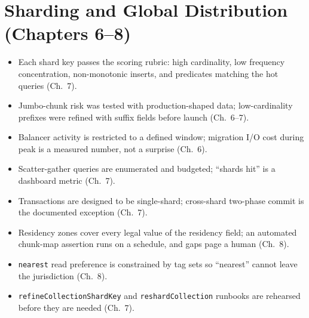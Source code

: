 \section{Sharding and Global Distribution (Chapters 6--8)}
%
\begin{itemize}
    \item[$\square$] Each shard key passes the scoring rubric: high cardinality, low frequency concentration, non-monotonic inserts, and predicates matching the hot queries (Ch.~7).
    \item[$\square$] Jumbo-chunk risk was tested with production-shaped data; low-cardinality prefixes were refined with suffix fields before launch (Ch.~6--7).
    \item[$\square$] Balancer activity is restricted to a defined window; migration I/O cost during peak is a measured number, not a surprise (Ch.~6).
    \item[$\square$] Scatter-gather queries are enumerated and budgeted; ``shards hit'' is a dashboard metric (Ch.~7).
    \item[$\square$] Transactions are designed to be single-shard; cross-shard two-phase commit is the documented exception (Ch.~7).
    \item[$\square$] Residency zones cover every legal value of the residency field; an automated chunk-map assertion runs on a schedule, and gaps page a human (Ch.~8).
    \item[$\square$] \texttt{nearest} read preference is constrained by tag sets so ``nearest'' cannot leave the jurisdiction (Ch.~8).
    \item[$\square$] \texttt{refineCollectionShardKey} and \texttt{reshardCollection} runbooks are rehearsed before they are needed (Ch.~7).
\end{itemize}


